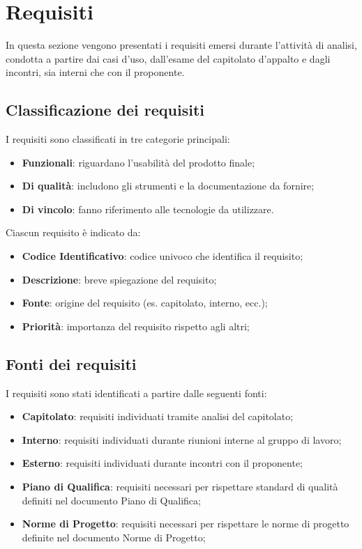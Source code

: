 \section{Requisiti}
In questa sezione vengono presentati i requisiti emersi durante l'attività di analisi, 
condotta a partire dai casi d'uso, dall'esame del capitolato d'appalto e dagli incontri, 
sia interni che con il proponente. 

\subsection{Classificazione dei requisiti}
I requisiti sono classificati in tre categorie principali:  
\begin{itemize}
	\item \textbf{Funzionali}: riguardano l'usabilità del prodotto finale;  
	\item \textbf{Di qualità}: includono gli strumenti e la documentazione da fornire;  
	\item \textbf{Di vincolo}: fanno riferimento alle tecnologie da utilizzare.
\end{itemize}
Ciascun requisito è indicato da:
\begin{itemize}
	\item \textbf{Codice Identificativo}: codice univoco che identifica il requisito;
	\item \textbf{Descrizione}: breve spiegazione del requisito;
	\item \textbf{Fonte}: origine del requisito (es. capitolato, interno, ecc.);
	\item \textbf{Priorità}: importanza del requisito rispetto agli altri;
\end{itemize} 

\subsection{Fonti dei requisiti}
I requisiti sono stati identificati a partire dalle seguenti fonti:
\begin{itemize}
	\item \textbf{Capitolato}: requisiti individuati tramite analisi del capitolato;
	\item \textbf{Interno}: requisiti individuati durante riunioni interne al gruppo di lavoro;
	\item \textbf{Esterno}: requisiti individuati durante incontri con il proponente;
	\item \textbf{Piano di Qualifica}: requisiti necessari per rispettare standard di qualità definiti nel documento Piano di Qualifica;
	\item \textbf{Norme di Progetto}: requisiti necessari per rispettare le norme di progetto definite nel documento Norme di Progetto;
\end{itemize}

